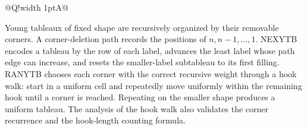 \documentclass[10pt,letterpaper]{article}
\begin{document}
\begin{longtable}{@{}Q!{\color{Mist}\vrule width 1pt}A@{}}
\end{longtable}
\begin{tcolorbox}[colback=Ink!4,colframe=Ink,title=Cornell summary]
Young tableaux of fixed shape are recursively organized by their removable corners. A corner-deletion path records the positions of $n,n-1,\ldots,1$. NEXYTB encodes a tableau by the row of each label, advances the least label whose path edge can increase, and resets the smaller-label subtableau to its first filling. RANYTB chooses each corner with the correct recursive weight through a hook walk: start in a uniform cell and repeatedly move uniformly within the remaining hook until a corner is reached. Repeating on the smaller shape produces a uniform tableau. The analysis of the hook walk also validates the corner recurrence and the hook-length counting formula.
\end{tcolorbox}
\end{document}
